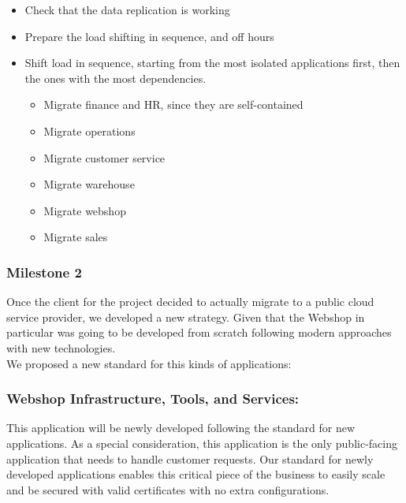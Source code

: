 \documentclass{llncs}
\begin{document}
\begin{itemize}
    \item Check that the data replication is working
    \item Prepare the load shifting in sequence, and off hours
    \item Shift load in sequence, starting from the most isolated applications first, then the ones with the most dependencies.
          \begin{itemize}
              \item Migrate finance and HR, since they are self-contained
              \item Migrate operations
              \item Migrate customer service
              \item Migrate warehouse
              \item Migrate webshop
              \item Migrate sales
          \end{itemize}
\end{itemize}


\subsubsection{Milestone 2}

Once the client for the project decided to actually migrate to a public cloud service provider, we developed a new strategy.
Given that the Webshop in particular was going to be developed from scratch following modern approaches with new technologies.\\
We proposed a new standard for this kinds of applications:

\subsubsection*{Webshop Infrastructure, Tools, and Services:}

This application will be newly developed following the standard for new applications.
As a special consideration, this application is the only public-facing application that needs to handle customer requests.
Our standard for newly developed applications enables this critical piece of the business to easily scale and be secured with valid certificates with no extra configurations.\\
\end{document}
